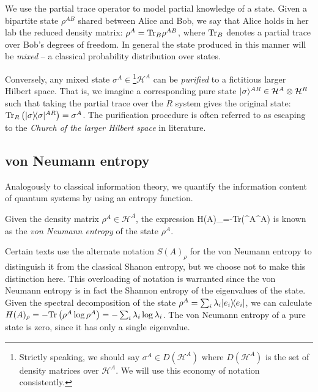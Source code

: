 \documentclass[aps,11pt,twoside,letterpaper]{article}
\def \Tr{\textup{Tr}}
\def\cH{\mathcal{H}}
\theoremstyle{plain}
\theoremstyle{definition}
\begin{document}
			We use the partial trace operator to model partial knowledge of a state.
			Given a bipartite state $\rho^{AB}$ shared between Alice and Bob, we say that Alice holds in her lab
			the reduced density matrix: $\rho^A = \Tr_B\rho^{AB}$, where $\Tr_B$ denotes a partial trace over 
			Bob's degrees of freedom.
			In general the state produced in this manner will be \emph{mixed} -- a classical probability distribution
			over states.
			
			Conversely, any mixed state $\sigma^A \in$\footnote{Strictly speaking, we should say 
			$\sigma^A \in D(\cH^A)$ where $D(\cH^A)$ is the set of density matrices over $\cH^A$. 
			We will use this economy of notation consistently.}$\cH^A$
			 can be \emph{purified} to a fictitious 
			larger Hilbert space. 
			That is, we imagine a corresponding pure state $\ket{\sigma}^{AR} \in \cH^A \otimes \cH^R$
			such that taking the partial trace over the $R$ system gives the original state: 
			$\Tr_R\left(\proj{\sigma}^{AR}\right)=\sigma^A$. 
			The purification procedure is often referred to as escaping to the \emph{Church of the larger
			Hilbert space} in literature.

		
		\bigskip			
		\subsection{von Neumann entropy}
		
			Analogously to classical information theory, we quantify the information content of quantum systems 
			by using an entropy function.
			
			\begin{definition} 
				Given the density matrix $\rho^A \in \cH^A$, the expression
				\be
					H(A)_\rho=-\Tr\left(\rho^A\log\rho^A\right)
				\ee
				is known as the \emph{von Neumann entropy} of the state $\rho^A$. 
			\end{definition}
			
			Certain texts use the alternate notation $S(A)_\rho$ for the von Neumann entropy to distinguish it 
			from the classical Shanon entropy, but we choose not to make this distinction here.
			This overloading of notation is warranted since the von Neumann entropy is in fact the 
			Shannon entropy of the eigenvalues of the state. 
			Given the spectral decomposition of the state $\rho^A = \sum_i \lambda_i | e_i \rangle\!\langle e_i |$, we 
			can calculate $H(A)_\rho=-\Tr\left(\rho^A\log\rho^A\right) = - \sum_i \lambda_i \log \lambda_i$.
			The von Neumann entropy of a pure state is zero, since it has only a single eigenvalue.
			
\end{document}
